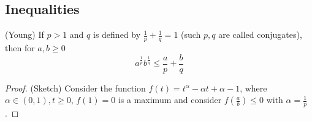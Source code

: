 







\subsection{Inequalities}

\begin{prop}
\label{young}
(Young) If $p>1$ and $q$ is defined by $\frac{1}{p}+\frac{1}{q}=1$ (such $p,q$ are called conjugates), then for $a,b \geq 0$  
\begin{equation}
    a^{\frac{1}{p}}b^{\frac{1}{q}} \leq \frac{a}{p} + \frac{b}{q} 
\end{equation}
\end{prop}  

\begin{proof}
    (Sketch) Consider the function $f(t) = t^{\alpha}-\alpha t+\alpha-1$, where $\alpha \in (0,1), t\geq 0$,
    $f(1)=0$ is a maximum and consider $f(\frac{a}{b})\leq 0$ with $\alpha=\frac{1}{p}$.  
\end{proof}

